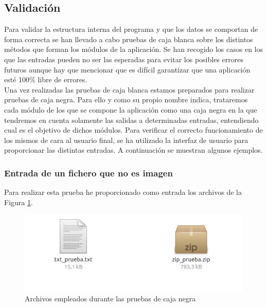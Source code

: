 \documentclass[a4paper,11pt]{book}
\begin{document}


\subsection{Validación}
Para validar la estructura interna del programa y que los datos se comportan de forma correcta se han llevado a cabo pruebas de caja blanca sobre los distintos métodos que forman los módulos de la aplicación. Se han recogido los casos en los que las entradas pueden no ser las esperadas para evitar los posibles errores futuros aunque hay que mencionar que es difícil garantizar que una aplicación esté 100\% libre de errores.\\

Una vez realizadas las pruebas de caja blanca estamos preparados para realizar pruebas de caja negra. Para ello y como su propio nombre indica, trataremos cada módulo de los que se compone la aplicación como una caja negra en la que tendremos en cuenta solamente las salidas a determinadas entradas, entendiendo cual es el objetivo de dichos módulos. Para verificar el correcto funcionamiento de los mismos de cara al usuario final, se ha utilizado la interfaz de usuario para proporcionar las distintas entradas. A continuación se muestran algunos ejemplos.
\subsubsection{Entrada de un fichero que no es imagen}
Para realizar esta prueba he proporcionado como entrada los archivos de la Figura \ref{fig:archivosValidacion}.\\

\begin{figure}[h]
\centering
\includegraphics[width=0.7\linewidth]{imagenes/archivosValidacion}
\caption[Archivos originales]{Archivos empleados durante las pruebas de caja negra}
\label{fig:archivosValidacion}
\end{figure}
\end{document}

